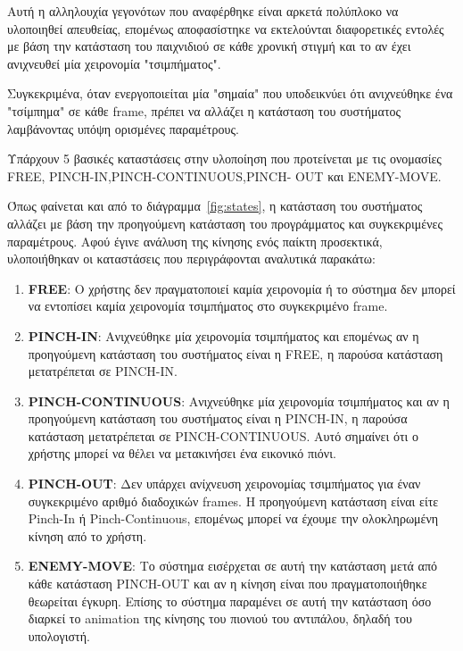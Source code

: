 Αυτή η αλληλουχία γεγονότων που αναφέρθηκε είναι αρκετά πολύπλοκο να υλοποιηθεί απευθείας, επομένως αποφασίστηκε να εκτελούνται διαφορετικές εντολές με βάση την κατάσταση του παιχνιδιού σε κάθε χρονική στιγμή και το αν έχει ανιχνευθεί μία χειρονομία "τσιμπήματος".

Συγκεκριμένα, όταν ενεργοποιείται μία "σημαία" που υποδεικνύει ότι ανιχνεύθηκε ένα "τσίμπημα" σε κάθε frame, πρέπει να αλλάζει η κατάσταση του συστήματος λαμβάνοντας υπόψη ορισμένες παραμέτρους.

Υπάρχουν 5 βασικές καταστάσεις στην υλοποίηση που προτείνεται με τις ονομασίες FREE, PINCH-IN,PINCH-CONTINUOUS,PINCH- OUT και ENEMY-MOVE. 

Όπως φαίνεται και από το διάγραμμα~\ref{fig:states}, η κατάσταση του συστήματος αλλάζει με βάση την προηγούμενη κατάσταση του προγράμματος και συγκεκριμένες παραμέτρους. Αφού έγινε ανάλυση της κίνησης ενός παίκτη προσεκτικά, υλοποιήθηκαν οι καταστάσεις που περιγράφονται αναλυτικά παρακάτω:

\begin{enumerate}
\item \textbf{FREE}: Ο χρήστης δεν πραγματοποιεί καμία χειρονομία ή το σύστημα δεν μπορεί να εντοπίσει καμία χειρονομία τσιμπήματος στο συγκεκριμένο frame.

\item \textbf{PINCH-IN}: Ανιχνεύθηκε μία χειρονομία τσιμπήματος και επομένως αν η προηγούμενη κατάσταση του συστήματος είναι η FREE, η παρούσα κατάσταση μετατρέπεται σε PINCH-IN.


\item \textbf{PINCH-CONTINUOUS}: Ανιχνεύθηκε μία χειρονομία τσιμπήματος και αν η προηγούμενη κατάσταση του συστήματος είναι η PINCH-IN, η παρούσα κατάσταση μετατρέπεται σε PINCH-CONTINUOUS. Αυτό σημαίνει ότι ο χρήστης μπορεί να θέλει να μετακινήσει ένα εικονικό πιόνι. 

\item \textbf{PINCH-OUT}: Δεν υπάρχει ανίχνευση χειρονομίας τσιμπήματος για έναν συγκεκριμένο αριθμό διαδοχικών frames. Η προηγούμενη κατάσταση είναι είτε Pinch-In ή Pinch-Continuous, επομένως μπορεί να έχουμε την ολοκληρωμένη κίνηση από το χρήστη. 


\item \textbf{ENEMY-MOVE}: Το σύστημα εισέρχεται σε αυτή την κατάσταση μετά από κάθε κατάσταση PINCH-OUT και αν η κίνηση είναι που πραγματοποιήθηκε θεωρείται έγκυρη. Επίσης το σύστημα παραμένει σε αυτή την κατάσταση όσο διαρκεί το animation της κίνησης του πιονιού του αντιπάλου, δηλαδή του υπολογιστή. 
\end{enumerate}




